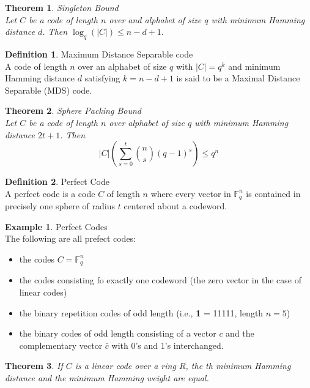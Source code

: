 \documentclass{article}
\newcommand{\F}{\mathbb{F}}
\newtheorem{theorem}{Theorem}
\theoremstyle{definition}
\newtheorem{definition}{Definition}
\newtheorem{example}{Example}
\begin{document}
\begin{theorem}{Singleton Bound}\\
  Let $C$ be a code of length $n$ over and alphabet of size $q$ with minimum Hamming distance $d$. Then $\log_q(|C|) \leq n-d+1.$
\end{theorem}

\begin{definition}{Maximum Distance Separable code}\\
  A code of length $n$ over an alphabet of size $q$ with $|C| = q^k$ and minimum Hamming distance $d$ satisfying $k=n-d+1$ is said to be a Maximal Distance Separable (MDS) code.
\end{definition}

\begin{theorem}{Sphere Packing Bound}\\
  Let $C$ be a code of length $n$ over alphabet of size $q$ with minimum Hamming distance $2t+1$. Then
  \[|C|\left(\sum_{s=0}^t {n \choose s}(q-1)^s\right)\leq q^n\]
\end{theorem}

\begin{definition}{Perfect Code}\\
  A perfect code is a code $C$ of length $n$ where every vector in $\F_q^n$ is contained in precisely one sphere of radius $t$ centered about a codeword.
\end{definition}

\begin{example}{Perfect Codes}\\
  The following are all prefect codes:
  \begin{itemize}
    \item the codes $C = \F_q^n$
    \item the codes consisting fo exactly one codeword (the zero vector in the case of linear codes)
    \item the binary repetition codes of odd length (i.e., \textbf{1} = 11111, length $n=5$)
    \item the binary codes of odd length consisting of a vector $c$ and the complementary vector $\bar{c}$ with 0's and 1's interchanged.
  \end{itemize}
\end{example}

\begin{theorem}
  If $C$ is a linear code over a ring $R$, the th minimum Hamming distance and the minimum Hamming weight are equal.
\end{theorem}
\end{document}
